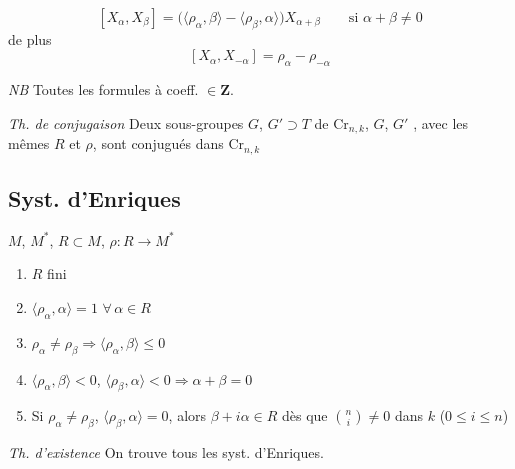 \documentclass[11pt,a4paper]{article}
\begin{document}
\[
  [X_\alpha, X_\beta] = \bigl(\langle \rho_\alpha, \beta \rangle -
    \langle \rho_\beta, \alpha \rangle\bigr) X_{\alpha+\beta}
  \qquad \text{si } \alpha + \beta \neq 0
\]
de plus
\[
  [X_\alpha, X_{-\alpha}] = \rho_\alpha - \rho_{-\alpha}
\]

\emph{NB} Toutes les formules à coeff. $\in \mathbf{Z}$.

\emph{Th. de conjugaison} Deux sous-groupes $G$, $G' \supset T$ de
$\mathrm{Cr}_{n,k}$, \struck{\ill{}} $G$, $G'$ , avec les
mêmes \struck{\ill{}} $R$ et $\rho$, sont conjugués dans $\mathrm{Cr}_{n,k}$
\ill{}


\subsection*{Syst. d'Enriques}

$M$, $M^{*}$, $R \subset M$, $\rho : R \longrightarrow M^{*}$

\begin{enumerate}
  \item[1)] $R$ fini
  \item[2)] $\langle \rho_\alpha, \alpha \rangle = 1$ \qquad
    $\forall\, \alpha \in R$
  \item[3)] $\rho_\alpha \neq \rho_\beta \Longrightarrow
    \langle \rho_\alpha, \beta \rangle \leq 0$
  \item[4)] $\langle \rho_\alpha, \beta \rangle < 0$, $\langle \rho_\beta,
    \alpha \rangle < 0 \Longrightarrow \alpha + \beta = 0$
  \item[5)] Si $\rho_\alpha \neq \rho_\beta$, $\langle \rho_\beta, \alpha
    \rangle = 0$, alors $\beta + i\alpha \in R$ dès que $\binom{n}{i} \neq 0$
    dans $k$ \quad ($0 \leq i \leq n$)
\end{enumerate}

\emph{Th. d'existence} On trouve tous les syst. d'Enriques.
\end{document}
